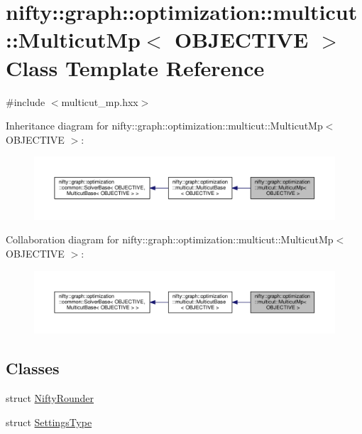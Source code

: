 \hypertarget{classnifty_1_1graph_1_1optimization_1_1multicut_1_1MulticutMp}{}\section{nifty\+:\+:graph\+:\+:optimization\+:\+:multicut\+:\+:Multicut\+Mp$<$ O\+B\+J\+E\+C\+T\+I\+V\+E $>$ Class Template Reference}
\label{classnifty_1_1graph_1_1optimization_1_1multicut_1_1MulticutMp}


{\ttfamily \#include $<$multicut\+\_\+mp.\+hxx$>$}



Inheritance diagram for nifty\+:\+:graph\+:\+:optimization\+:\+:multicut\+:\+:Multicut\+Mp$<$ O\+B\+J\+E\+C\+T\+I\+V\+E $>$\+:\nopagebreak
\begin{figure}[H]
\begin{center}
\leavevmode
\includegraphics[width=350pt]{classnifty_1_1graph_1_1optimization_1_1multicut_1_1MulticutMp__inherit__graph}
\end{center}
\end{figure}


Collaboration diagram for nifty\+:\+:graph\+:\+:optimization\+:\+:multicut\+:\+:Multicut\+Mp$<$ O\+B\+J\+E\+C\+T\+I\+V\+E $>$\+:\nopagebreak
\begin{figure}[H]
\begin{center}
\leavevmode
\includegraphics[width=350pt]{classnifty_1_1graph_1_1optimization_1_1multicut_1_1MulticutMp__coll__graph}
\end{center}
\end{figure}
\subsection*{Classes}
\begin{DoxyCompactItemize}
\item 
struct \hyperlink{structnifty_1_1graph_1_1optimization_1_1multicut_1_1MulticutMp_1_1NiftyRounder}{Nifty\+Rounder}
\item 
struct \hyperlink{structnifty_1_1graph_1_1optimization_1_1multicut_1_1MulticutMp_1_1SettingsType}{Settings\+Type}
\end{DoxyCompactItemize}
